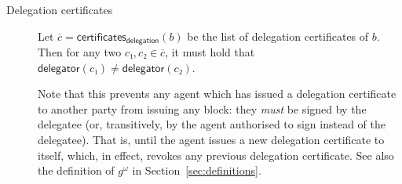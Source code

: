\documentclass{article}
\newcommand{\transitivefix}[1]{{#1}^ω}
\newcommand{\delegator}[1]{\mathsf{delegator}(#1)}
\newcommand{\delegationcertificates}[1]{\mathsf{certificates}_\mathsf{delegation}(#1)}
\begin{document}
\begin{description}
\begin{description}
\begin{description}
    \end{description}
  \end{description}

\item[Delegation certificates] Let
  $\overline{c}=\delegationcertificates{b}$ be the list of delegation
  certificates of $b$. Then for any two $c₁,c₂∈\overline{c}$, it must
  hold that $\delegator{c₁}≠\delegator{c₂}$.

  Note that this prevents any agent which has issued a delegation certificate to
  another party from issuing any block: they \emph{must} be signed by the
  delegatee (or, transitively, by the agent authorised to sign instead of the
  delegatee). That is, until the agent issues a new delegation certificate to
  itself, which, in effect, revokes any previous delegation certificate. See
  also the definition of $\transitivefix{g}$ in Section~\ref{sec:definitions}.


\end{description}
\end{document}
